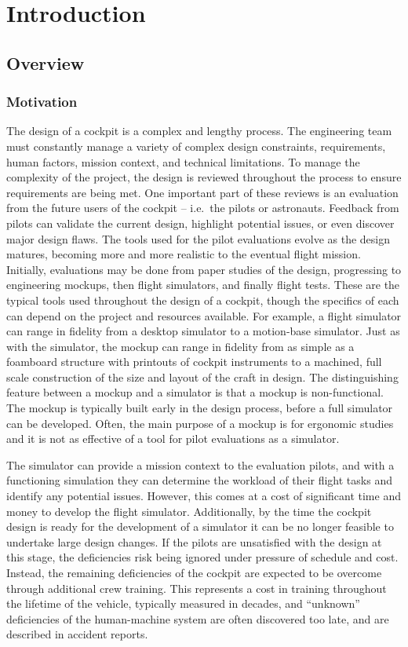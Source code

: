 \chapter{Introduction}


\section{Overview}

\subsection{Motivation}
\label{sec:intro_overview}

The design of a cockpit is a complex and lengthy process.
The engineering team must constantly manage a variety of complex design constraints, requirements, human factors, mission context, and technical limitations.
To manage the complexity of the project, the design is reviewed throughout the process to ensure requirements are being met.
 One important part of these reviews is an evaluation from the future users of the cockpit -- i.e.\ the pilots or astronauts.
Feedback from pilots can validate the current design, highlight potential issues, or even discover major design flaws.
The tools used for the pilot evaluations evolve as the design matures, becoming more and more realistic to the eventual flight mission.
Initially, evaluations may be done from paper studies of the design, progressing to engineering mockups, then flight simulators, and finally flight tests.
These are the typical tools used throughout the design of a cockpit, though the specifics of each can depend on the project and resources available.
For example, a flight simulator can range in fidelity from a desktop simulator to a motion-base simulator.
Just as with the simulator, the mockup can range in fidelity from as simple as a foamboard structure with printouts of cockpit instruments to a machined, full scale construction of the size and layout of the craft in design.
The distinguishing feature between a mockup and a simulator is that a mockup is non-functional.
The mockup is typically built early in the design process, before a full simulator can be developed.
Often, the main purpose of a mockup is for ergonomic studies and it is not as effective of a tool for pilot evaluations as a simulator.

The simulator can provide a mission context to the evaluation pilots, and with a functioning simulation they can determine the workload of their flight tasks and identify any potential issues.
However, this comes at a cost of significant time and money to develop the flight simulator.
Additionally, by the time the cockpit design is ready for the development of a simulator it can be no longer feasible to undertake large design changes.
If the pilots are unsatisfied with the design at this stage, the deficiencies risk being ignored under pressure of schedule and cost.
Instead, the remaining deficiencies of the cockpit are expected to be overcome through additional crew training.
This represents a cost in training throughout the lifetime of the vehicle, typically measured in decades, and ``unknown'' deficiencies of the human-machine system are often discovered too late, and are described in accident reports.

